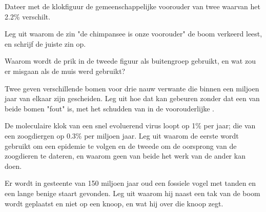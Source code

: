\begin{exercise}[$\star\star$]\label{exo:g12:phylogenetic-trees:9}
Dateer met de klokfiguur de gemeenschappelijke voorouder van twee 
waarvan het  2.2\% verschilt.
\end{exercise}

\begin{exercise}[$\star\star$]\label{exo:g12:phylogenetic-trees:10}
Leg uit waarom de zin "de chimpansee is onze voorouder" de boom verkeerd
leest, en schrijf de juiste zin op.
\end{exercise}

\begin{exercise}[$\star\star$]\label{exo:g12:phylogenetic-trees:11}
Waarom wordt de prik in de tweede figuur als buitengroep gebruikt, en wat
zou er misgaan als de muis werd gebruikt?
\end{exercise}

\begin{exercise}[$\star\star\star$]\label{exo:g12:phylogenetic-trees:12}
Twee  geven verschillende bomen voor drie nauw verwante  die
binnen een miljoen jaar van elkaar zijn gescheiden. Leg uit hoe dat kan
gebeuren zonder dat een van beide bomen "fout" is, met het schudden van
 in de voorouderlijke .
\end{exercise}

\begin{exercise}[$\star\star\star$]\label{exo:g12:phylogenetic-trees:13}
De moleculaire klok van een snel evoluerend virus loopt op 1\% per jaar;
die van een zoogdiergen op 0.3\% per miljoen jaar. Leg uit waarom de
eerste wordt gebruikt om een epidemie te volgen en de tweede om de
oorsprong van de zoogdieren te dateren, en waarom geen van beide het werk
van de ander kan doen.
\end{exercise}

\begin{exercise}[$\star\star\star$]\label{exo:g12:phylogenetic-trees:14}
Er wordt in gesteente van 150 miljoen jaar oud een fossiele vogel met
tanden en een lange benige staart gevonden. Leg uit waarom hij naast een
tak van de boom wordt geplaatst en niet op een knoop, en wat hij over die
knoop zegt.
\end{exercise}

